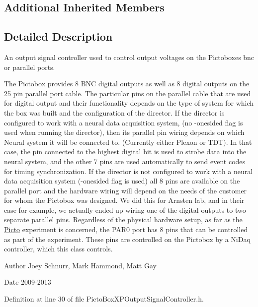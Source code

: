 \subsection*{Additional Inherited Members}


\subsection{Detailed Description}
An output signal controller used to control output voltages on the Pictoboxes bnc or parallel ports. 

The Pictobox provides 8 B\-N\-C digital outputs as well as 8 digital outputs on the 25 pin parallel port cable. The particular pins on the parallel cable that are used for digital output and their functionality depends on the type of system for which the box was built and the configuration of the director. If the director is configured to work with a neural data acquisition system, (no -\/onesided flag is used when running the director), then its parallel pin wiring depends on which Neural system it will be connected to. (Currently either Plexon or T\-D\-T). In that case, the pin connected to the highest digital bit is used to strobe data into the neural system, and the other 7 pins are used automatically to send event codes for timing synchronization. If the director is not configured to work with a neural data acquisition system (-\/onesided flag is used) all 8 pins are available on the parallel port and the hardware wiring will depend on the needs of the customer for whom the Pictobox was designed. We did this for Arnsten lab, and in their case for example, we actually ended up wiring one of the digital outputs to two separate parallel pins. Regardless of the physical hardware setup, as far as the \hyperlink{namespace_picto}{Picto} experiment is concerned, the P\-A\-R0 port has 8 pins that can be controlled as part of the experiment. These pins are controlled on the Pictobox by a Ni\-Daq controller, which this class controls. \begin{DoxyAuthor}{Author}
Joey Schnurr, Mark Hammond, Matt Gay 
\end{DoxyAuthor}
\begin{DoxyDate}{Date}
2009-\/2013 
\end{DoxyDate}


Definition at line 30 of file Picto\-Box\-X\-P\-Output\-Signal\-Controller.\-h.



